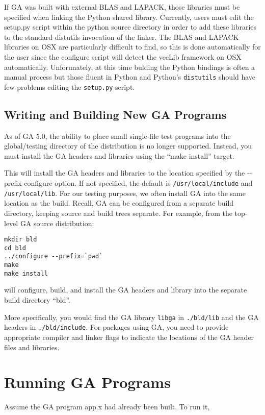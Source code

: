 If GA was built with external BLAS and LAPACK, those libraries must be
specified when linking the Python shared library. Currently, users must edit
the setup.py script within the python source directory in order to add these
libraries to the standard distutils invocation of the linker. The BLAS and
LAPACK libraries on OSX are particularly difficult to find, so this is done
automatically for the user since the configure script will detect the vecLib
framework on OSX automatically.  Unforunately, at this time bulding the Python
bindings is often a manual process but those fluent in Python and Python's
\texttt{distutils} should have few problems editing the \texttt{setup.py}
script. 

\subsection{Writing and Building New GA Programs}

As of GA 5.0, the ability to place small single-file test programs into the
global/testing directory of the distribution is no longer supported. Instead,
you must install the GA headers and libraries using the ``make install''
target.

This will install the GA headers and libraries to the location specified by the
-{}-prefix configure option. If not specified, the default is
\texttt{/usr/local/include} and \texttt{/usr/local/lib}.  For our testing
purposes, we often install GA into the same location as the build. Recall, GA
can be configured from a separate build directory, keeping source and build
trees separate. For example, from the top-level GA source distribution: 
\begin{verbatim}
mkdir bld
cd bld
../configure --prefix=`pwd`
make
make install
\end{verbatim}
will configure, build, and install the GA headers and library into the separate
build directory ``bld''.

More specifically, you would find the GA library \texttt{libga} in
\texttt{./bld/lib} and the GA headers in \texttt{./bld/include}. For packages
using GA, you need to provide appropriate compiler and linker flags to indicate
the locations of the GA header files and libraries. 

\section{Running GA Programs}

Assume the GA program app.x had already been built. To run it,

